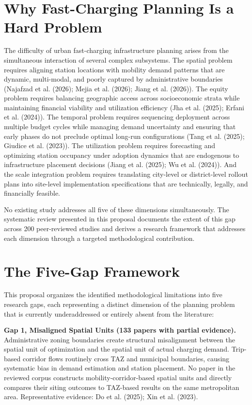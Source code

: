 \documentclass[letterpaper, 12pt, oneside, doublespacing]{Thesis}
\begin{document}
\section{Why Fast-Charging Planning Is a Hard Problem}

The difficulty of urban fast-charging infrastructure planning arises from the simultaneous interaction of several complex subsystems. The spatial problem requires aligning station locations with mobility demand patterns that are dynamic, multi-modal, and poorly captured by administrative boundaries (Najafzad et al. (2026); Mejia et al. (2026); Jiang et al. (2026)). The equity problem requires balancing geographic access across socioeconomic strata while maintaining financial viability and utilization efficiency (Jha et al. (2025); Erfani et al. (2024)). The temporal problem requires sequencing deployment across multiple budget cycles while managing demand uncertainty and ensuring that early phases do not preclude optimal long-run configurations (Tang et al. (2025); Giudice et al. (2023)). The utilization problem requires forecasting and optimizing station occupancy under adoption dynamics that are endogenous to infrastructure placement decisions (Jiang et al. (2025); Wu et al. (2024)). And the scale integration problem requires translating city-level or district-level rollout plans into site-level implementation specifications that are technically, legally, and financially feasible.

No existing study addresses all five of these dimensions simultaneously. The systematic review presented in this proposal documents the extent of this gap across 200 peer-reviewed studies and derives a research framework that addresses each dimension through a targeted methodological contribution.

\section{The Five-Gap Framework}

This proposal organizes the identified methodological limitations into five research gaps, each representing a distinct dimension of the planning problem that is currently underaddressed or entirely absent from the literature:


\noindent \textbf{Gap 1, Misaligned Spatial Units (133 papers with partial evidence).} Administrative zoning boundaries create structural misalignment between the spatial unit of optimization and the spatial unit of actual charging demand. Trip-based corridor flows routinely cross TAZ and municipal boundaries, causing systematic bias in demand estimation and station placement. No paper in the reviewed corpus constructs mobility-corridor-based spatial units and directly compares their siting outcomes to TAZ-based results on the same metropolitan area. Representative evidence: Do et al. (2025); Xin et al. (2023).
\end{document}
